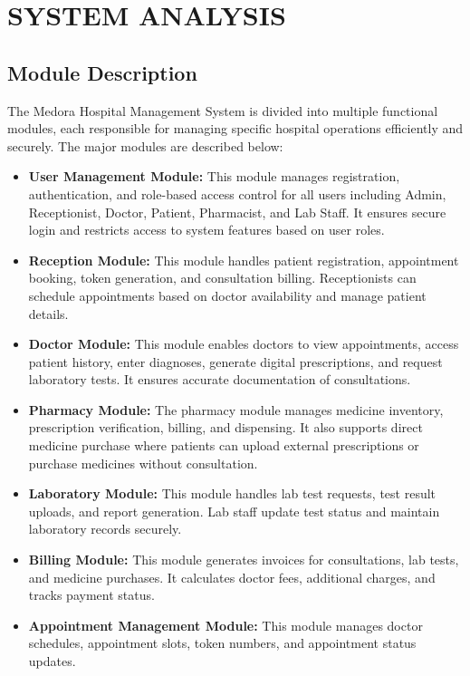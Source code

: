 \chapter{SYSTEM ANALYSIS}

\section{Module Description}

The Medora Hospital Management System is divided into multiple functional modules, each responsible for managing specific hospital operations efficiently and securely. The major modules are described below:

\begin{itemize}

\item \textbf{User Management Module:}
This module manages registration, authentication, and role-based access control for all users including Admin, Receptionist, Doctor, Patient, Pharmacist, and Lab Staff. It ensures secure login and restricts access to system features based on user roles.

\item \textbf{Reception Module:}
This module handles patient registration, appointment booking, token generation, and consultation billing. Receptionists can schedule appointments based on doctor availability and manage patient details.

\item \textbf{Doctor Module:}
This module enables doctors to view appointments, access patient history, enter diagnoses, generate digital prescriptions, and request laboratory tests. It ensures accurate documentation of consultations.

\item \textbf{Pharmacy Module:}
The pharmacy module manages medicine inventory, prescription verification, billing, and dispensing. It also supports direct medicine purchase where patients can upload external prescriptions or purchase medicines without consultation.

\item \textbf{Laboratory Module:}
This module handles lab test requests, test result uploads, and report generation. Lab staff update test status and maintain laboratory records securely.

\item \textbf{Billing Module:}
This module generates invoices for consultations, lab tests, and medicine purchases. It calculates doctor fees, additional charges, and tracks payment status.

\item \textbf{Appointment Management Module:}
This module manages doctor schedules, appointment slots, token numbers, and appointment status updates.

\end{itemize}

